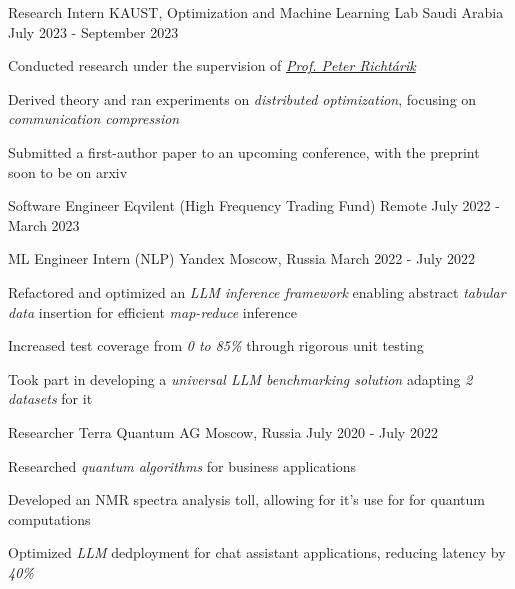 
\begin{cventries}
  \cventry
    {Research Intern}
    {KAUST, Optimization and Machine Learning Lab}
    {Saudi Arabia}
    {July 2023 - September 2023}
    {
      \begin{cvitems}
        \item {Conducted research under the supervision of  \href{https://richtarik.org/}{\textit{Prof. Peter Richtárik}}}
        \item {Derived theory and ran experiments on \textit{distributed optimization}, focusing on \textit{communication compression}}
        \item {Submitted a first-author paper to an upcoming conference, with the preprint soon to be on arxiv}
      \end{cvitems}
    }

  \cventry
    {Software Engineer}
    {Eqvilent (High Frequency Trading Fund)}
    {Remote}
    {July 2022 - March 2023}
    {}

  \cventry
    {ML Engineer Intern (NLP)}
    {Yandex}
    {Moscow, Russia}
    {March 2022 - July 2022}
    {
      \begin{cvitems} %
        \item {Refactored and optimized an \textit{LLM inference framework} enabling abstract \textit{tabular data} insertion for efficient \textit{map-reduce} inference}
        \item {Increased test coverage from \textit{0 to 85\%} through rigorous unit testing}
        \item {Took part in developing a \textit{universal LLM benchmarking solution} adapting \textit{2 datasets} for it}
      \end{cvitems}
    }
    
  \cventry
    {Researcher} %
    {Terra Quantum AG} %
    {Moscow, Russia} %
    {July 2020 - July 2022} %
    {
      \begin{cvitems} %
        \item { Researched \textit{quantum algorithms} for business applications }
        \item { Developed an {NMR spectra} analysis toll, allowing for it's use for  for quantum computations }
        \item { Optimized \textit{LLM} dedployment for chat assistant applications, reducing latency by \textit{40\%} }
      \end{cvitems}
    }
    
\end{cventries}
